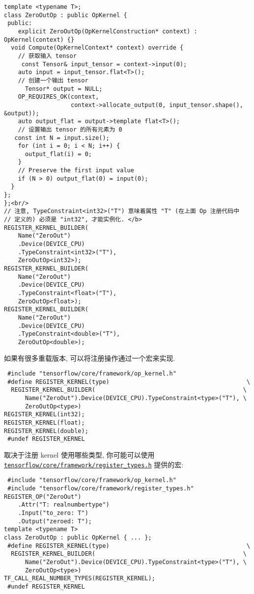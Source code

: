 \begin{verbatim}
template <typename T>;
class ZeroOutOp : public OpKernel {
 public:
    explicit ZeroOutOp(OpKernelConstruction* context) : OpKernel(context) {}
  void Compute(OpKernelContext* context) override {
    // 获取输入 tensor
     const Tensor& input_tensor = context->input(0);
    auto input = input_tensor.flat<T>();
    // 创建一个输出 tensor
      Tensor* output = NULL;
    OP_REQUIRES_OK(context,
                   context->allocate_output(0, input_tensor.shape(), &output));
    auto output_flat = output->template flat<T>();
    // 设置输出 tensor 的所有元素为 0
   const int N = input.size();
    for (int i = 0; i < N; i++) {
      output_flat(i) = 0;
    }
    // Preserve the first input value
    if (N > 0) output_flat(0) = input(0);
  }
};
};<br/>
// 注意, TypeConstraint<int32>("T") 意味着属性 "T" (在上面 Op 注册代码中
// 定义的) 必须是 "int32", 才能实例化. </b>
REGISTER_KERNEL_BUILDER(
    Name("ZeroOut")
    .Device(DEVICE_CPU)
    .TypeConstraint<int32>("T"),
    ZeroOutOp<int32>);
REGISTER_KERNEL_BUILDER(
    Name("ZeroOut")
    .Device(DEVICE_CPU)
    .TypeConstraint<float>("T"),
    ZeroOutOp<float>);
REGISTER_KERNEL_BUILDER(
    Name("ZeroOut")
    .Device(DEVICE_CPU)
    .TypeConstraint<double>("T"),
    ZeroOutOp<double>);
\end{verbatim}

如果有很多重载版本, 可以将注册操作通过一个宏来实现.

\begin{verbatim}
 #include "tensorflow/core/framework/op_kernel.h"
 #define REGISTER_KERNEL(type)                                       \
  REGISTER_KERNEL_BUILDER(                                          \
      Name("ZeroOut").Device(DEVICE_CPU).TypeConstraint<type>("T"), \
      ZeroOutOp<type>)
REGISTER_KERNEL(int32);
REGISTER_KERNEL(float);
REGISTER_KERNEL(double);
 #undef REGISTER_KERNEL
\end{verbatim}

取决于注册 kernel 使用哪些类型,
你可能可以使用\href{https://tensorflow.googlesource.com/tensorflow/+/master/tensorflow/core/framework/register_types.h}{\texttt{tensorflow/core/framework/register\_types.h}}
提供的宏:

\begin{verbatim}
 #include "tensorflow/core/framework/op_kernel.h"
 #include "tensorflow/core/framework/register_types.h"
REGISTER_OP("ZeroOut")
    .Attr("T: realnumbertype")
    .Input("to_zero: T")
    .Output("zeroed: T");
template <typename T>
class ZeroOutOp : public OpKernel { ... };
 #define REGISTER_KERNEL(type)                                       \
  REGISTER_KERNEL_BUILDER(                                          \
      Name("ZeroOut").Device(DEVICE_CPU).TypeConstraint<type>("T"), \
      ZeroOutOp<type>)
TF_CALL_REAL_NUMBER_TYPES(REGISTER_KERNEL);
 #undef REGISTER_KERNEL
\end{verbatim}

